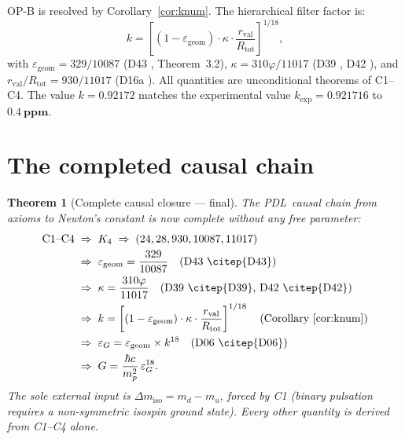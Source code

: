 \documentclass[12pt,a4paper]{article}
\theoremstyle{plain}
\newtheorem{theorem}{Theorem}[section]
\theoremstyle{definition}
\theoremstyle{remark}
\newenvironment{resolvedproblem}[1][]{%
\begin{tcolorbox}[resolvedstyle,title={Resolved: #1}]}{\end{tcolorbox}}
\newcommand{\PDL}{\textsc{PDL}}
\newcommand{\Kfour}{K_4}
\newcommand{\vp}{\varphi}
\newcommand{\kap}{\kappa}
\newcommand{\rval}{r_{\mathrm{val}}}
\newcommand{\Rtot}{R_{\mathrm{tot}}}
\newcommand{\egeom}{\varepsilon_{\mathrm{geom}}}
\newcommand{\eG}{\varepsilon_G}
\newcommand{\dmiso}{\Delta m_{\mathrm{iso}}}
\begin{document}
\begin{resolvedproblem}[OP-B --- Derivation of $k$ from C1--C4]
OP-B is resolved by Corollary~\ref{cor:knum}. The hierarchical filter factor is:
\[
k = \left[(1-\egeom)\cdot\kap\cdot\frac{\rval}{\Rtot}\right]^{1/18},
\]
with $\egeom = 329/10087$ (D43 \citep{D43}, Theorem~3.2), $\kap = 310\vp/11017$ (D39 \citep{D39}, D42 \citep{D42}), and $\rval/\Rtot = 930/11017$ (D16a \citep{D16a}). All quantities are unconditional theorems of C1--C4. The value $k = 0.92172$ matches the experimental value $k_{\exp} = 0.921716$ to $\mathbf{0.4~ppm}$.
\end{resolvedproblem}

\section{The completed causal chain}
\label{sec:chain}

\begin{theorem}[Complete causal closure --- final]
\label{thm:closure_final}
The \PDL\ causal chain from axioms to Newton's constant is now complete without any free parameter:
\begin{align*}
\mathrm{C1\text{--}C4} &\;\Rightarrow\; \Kfour \;\Rightarrow\; (24,28,930,10087,11017)\\
&\;\Rightarrow\; \egeom = \frac{329}{10087} \quad\text{(D43 \citep{D43})}\\
&\;\Rightarrow\; \kap = \frac{310\vp}{11017} \quad\text{(D39 \citep{D39}, D42 \citep{D42})}\\
&\;\Rightarrow\; k = \left[(1-\egeom)\cdot\kap\cdot\frac{\rval}{\Rtot}\right]^{1/18} \quad\text{(Corollary~\ref{cor:knum})}\\
&\;\Rightarrow\; \eG = \egeom\times k^{18} \quad\text{(D06 \citep{D06})}\\
&\;\Rightarrow\; G = \frac{\hbar c}{m_p^2}\,\eG^{18}.
\end{align*}
The sole external input is $\dmiso = m_d - m_u$, forced by C1 (binary pulsation requires a non-symmetric isospin ground state). Every other quantity is derived from C1--C4 alone.
\end{theorem}
\end{document}
